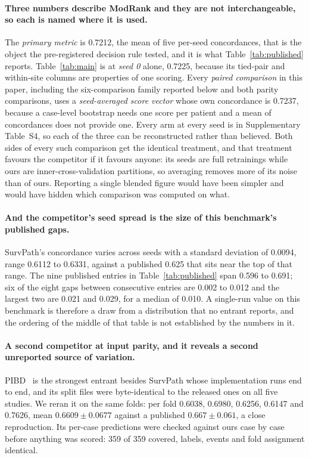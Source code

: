 \documentclass[unnumsec,webpdf,contemporary,large]{oup-authoring-template}
\begin{document}
\paragraph{Three numbers describe ModRank and they are not interchangeable, so each is named where it is used.} The \emph{primary metric} is 0.7212, the mean of five per-seed concordances, that is the
object the pre-registered decision rule tested, and it is what Table~\ref{tab:published} reports.
Table~\ref{tab:main} is at \emph{seed 0} alone, 0.7225, because its tied-pair and within-site
columns are properties of one scoring. Every \emph{paired comparison} in this paper, including
the six-comparison family reported below and both parity comparisons, uses a
\emph{seed-averaged score vector} whose own
concordance is 0.7237, because a case-level bootstrap needs one score per patient and a mean of
concordances does not provide one. Every arm at every seed is in Supplementary Table~S4, so each
of the three can be reconstructed rather than believed. Both sides of every such comparison get the identical treatment,
and that treatment favours the competitor if it favours anyone: its seeds are full retrainings while
ours are inner-cross-validation partitions, so averaging removes more of its noise than of ours.
Reporting a single blended figure would have been simpler and would have hidden which comparison was
computed on what.

\paragraph{And the competitor's seed spread is the size of this benchmark's published gaps.}
SurvPath's concordance varies across seeds with a standard deviation of 0.0094, range
0.6112 to 0.6331, against a published 0.625 that sits near the top of that range. The nine
published entries in Table~\ref{tab:published} span 0.596 to 0.691; six of the eight gaps between
consecutive entries are 0.002 to 0.012 and the largest two are 0.021 and 0.029, for a median of
0.010. A single-run value on this benchmark is therefore a draw from a distribution that no entrant reports, and the ordering of the middle of that table is not established by the
numbers in it.

\paragraph{A second competitor at input parity, and it reveals a second unreported source of
variation.} PIBD~\citep{zhang2024pibd} is the strongest entrant besides SurvPath whose implementation
runs end to end, and its split files were byte-identical to the released ones on all five studies.
We reran it on the same folds: per fold 0.6038, 0.6980, 0.6256, 0.6147 and 0.7626, mean
$\mathbf{0.6609 \pm 0.0677}$ against a published $0.667 \pm 0.061$, a close reproduction. Its
per-case predictions were checked against ours case by case before anything was scored: 359 of 359
covered, labels, events and fold assignment identical.
\end{document}
